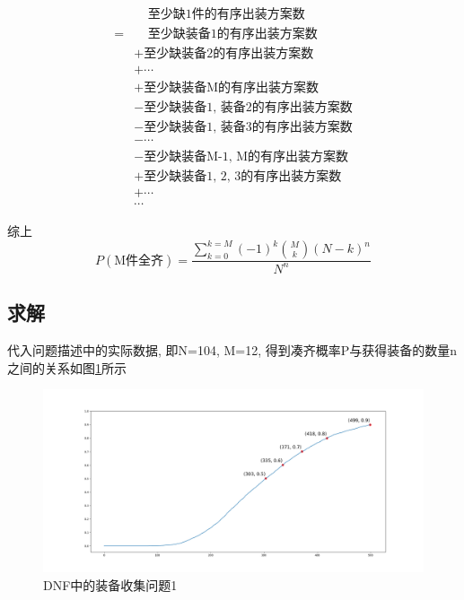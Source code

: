 \documentclass[10pt,journal,compsoc]{IEEEtran}
\begin{document}
    \begin{equation*}
      \begin{split}
        &~~~~~\text{至少缺1件的有序出装方案数} \\
        =&~~~~~\text{至少缺装备1的有序出装方案数} \\
        &+ \text{至少缺装备2的有序出装方案数} \\
        &+ \cdots \\
        &+ \text{至少缺装备M的有序出装方案数} \\
        &- \text{至少缺装备1, 装备2的有序出装方案数} \\
        &- \text{至少缺装备1, 装备3的有序出装方案数} \\
        &- \cdots \\
        &- \text{至少缺装备M-1, M的有序出装方案数} \\
        &+ \text{至少缺装备1, 2, 3的有序出装方案数} \\
        &+ \cdots \\
        &\cdots
      \end{split}
    \end{equation*}

    综上
    $$
    P(\text{M件全齐})=\frac{\sum_{k=0}^{k=M}(-1)^k\binom{M}{k}(N-k)^n}{N^n}
    $$

  \subsection{求解}
    代入问题描述中的实际数据, 即N=104, M=12, 得到凑齐概率P与获得装备的数量n之间的关系如图\ref{fig:solution1}所示

    \begin{figure}[!ht]
    \centering
    \includegraphics[width=30pc]{img/solution1.png}
    \caption{DNF中的装备收集问题1}
    \label{fig:solution1}
    \end{figure}
\end{document}
